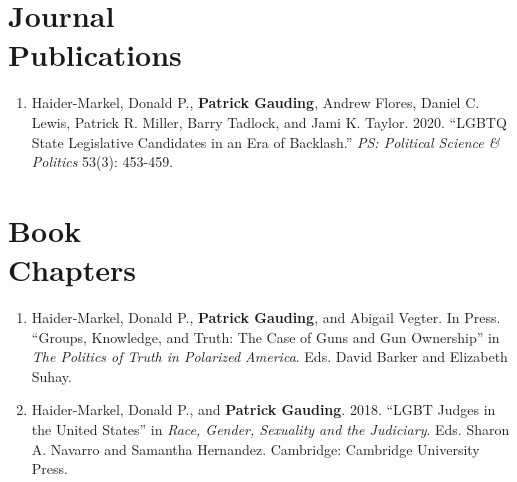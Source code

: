 \documentclass[margin,line,pifont,palatino,courier]{res}
\begin{document}
\begin{resume}
\section{\sc Journal \\Publications}

\begin{enumerate}
  
\item Haider-Markel, Donald P., \textbf{Patrick Gauding}, Andrew Flores,
Daniel C. Lewis, Patrick R. Miller, Barry Tadlock, and Jami
K. Taylor. 2020. ``LGBTQ State Legislative Candidates in an Era
of Backlash.'' \emph{PS: Political Science \& Politics} 53(3): 453-459.


\end{enumerate}

\section{\sc Book \\Chapters}

\begin{enumerate}

\item Haider-Markel, Donald P., \textbf{Patrick Gauding}, and Abigail
  Vegter. In Press. ``Groups, Knowledge, and Truth: The Case of Guns and Gun
  Ownership'' in \textit{The Politics of Truth in Polarized
    America}. Eds. David Barker and Elizabeth Suhay.

\item Haider-Markel, Donald P., and \textbf{Patrick Gauding}. 2018. ``LGBT Judges
in the United States'' in \textit{Race, Gender, Sexuality and the
  Judiciary}. Eds. Sharon A. Navarro  and Samantha
Hernandez. Cambridge: Cambridge University Press.

\end{enumerate}





\end{resume}
\end{document}
